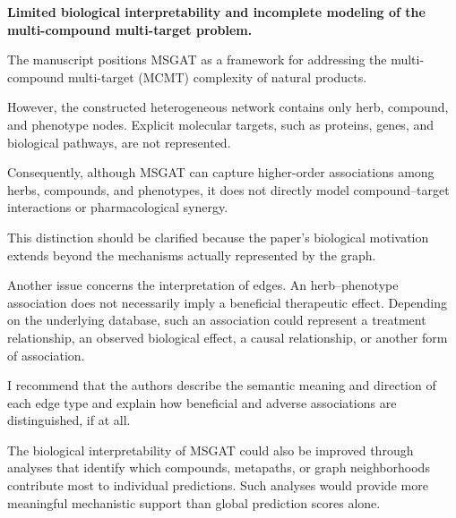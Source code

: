 \documentclass[11pt,american]{article}
\begin{document}
\begin{revcomment}
\textbf{Limited biological interpretability and incomplete modeling of the multi-compound multi-target problem.}

The manuscript positions MSGAT as a framework for addressing the multi-compound multi-target (MCMT) complexity of natural products.

However, the constructed heterogeneous network contains only herb, compound, and phenotype nodes. Explicit molecular targets, such as proteins, genes, and biological pathways, are not represented.

Consequently, although MSGAT can capture higher-order associations among herbs, compounds, and phenotypes, it does not directly model compound--target interactions or pharmacological synergy.

This distinction should be clarified because the paper's biological motivation extends beyond the mechanisms actually represented by the graph.

Another issue concerns the interpretation of edges. An herb--phenotype association does not necessarily imply a beneficial therapeutic effect. Depending on the underlying database, such an association could represent a treatment relationship, an observed biological effect, a causal relationship, or another form of association.

I recommend that the authors describe the semantic meaning and direction of each edge type and explain how beneficial and adverse associations are distinguished, if at all.

The biological interpretability of MSGAT could also be improved through analyses that identify which compounds, metapaths, or graph neighborhoods contribute most to individual predictions. Such analyses would provide more meaningful mechanistic support than global prediction scores alone.
\end{revcomment}

\begin{revresponse}

\end{revresponse}
\end{document}
